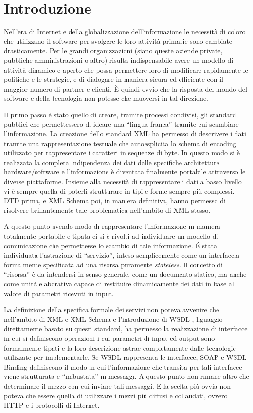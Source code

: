 \chapter{Introduzione}

Nell'era di Internet e della globalizzazione dell'informazione le necessità di
coloro che utilizzano il software per svolgere le loro attività primarie sono
cambiate drasticamente. Per le grandi organizzazioni (siano queste aziende
private, pubbliche amministrazioni o altro) risulta indispensabile avere un
modello di attività dinamico e aperto che possa permettere loro di modificare
rapidamente le politiche e le strategie, e di dialogare in maniera sicura ed
efficiente con il maggior numero di partner e clienti. \`E quindi ovvio che la
risposta del mondo del software e della tecnologia non potesse che muoversi in
tal direzione. 

Il primo passo è stato quello di creare, tramite processi condivisi, gli
standard pubblici che permettessero di ideare una ``lingua franca'' tramite cui
scambiare l'informazione. La creazione dello standard XML \cite{XML} ha permesso di
descrivere i dati tramite una rappresentazione testuale che autoesplicita lo schema di
encoding utilizzato per rappresentare i caratteri in sequenze di byte. In questo
modo si è realizzata la completa indipendenza dei dati dalle specifiche
architetture hardware/software e l'informazione è diventata finalmente portabile
attraverso le diverse piattaforme. Insieme alla necessità di rappresentare i dati
a basso livello vi è sempre quella di poterli strutturare in tipi e forme sempre
più complessi. DTD \cite{XML10} prima, e XML Schema \cite{XMLSchema} poi, in
maniera definitiva, hanno permesso di risolvere brillantemente tale problematica nell'ambito di XML stesso.

A questo punto avendo modo di rappresentare l'informazione in maniera totalmente
portabile e tipata ci si è rivolti ad individuare un modello di
comunicazione che permettesse lo scambio di tale informazione. \'E stata
individuata l'astrazione di ``servizio'', inteso semplicemente come un
interfaccia formalmente specificata ad una risorsa puramente \emph{stateless}.
Il concetto di ``risorsa'' è da intendersi in senso generale, come un documento
statico, ma anche come unità elaborativa capace di restituire dinamicamente
dei dati in base al valore di parametri ricevuti in input.

La definizione della specifica formale dei servizi non poteva avvenire che
nell'ambito di XML e XML Schema e l'introduzione di WSDL \cite{WSDL}, liguaggio
direttamente basato su questi standard, ha permesso la realizzazione di
interfacce in cui si definiscono operazioni i cui parametri di input ed output
sono formalmente tipati e la loro descrizione astrae completamente dalle
tecnologie utilizzate per implementarle. Se WSDL rappresenta le interfacce, SOAP
\cite{SOAP} e WSDL Binding \cite{WSDL} definiscono il modo in cui l'informazione
che transita per tali interfacce viene strutturata e ``imbustata'' in messaggi. A
questo punto non rimane altro che determinare il mezzo con cui inviare tali
messaggi. E la scelta più ovvia non poteva che essere quella di utilizzare i
mezzi più diffusi e collaudati, ovvero HTTP \cite{HTTP} \cite{HTTP1} e i
protocolli di Internet.

